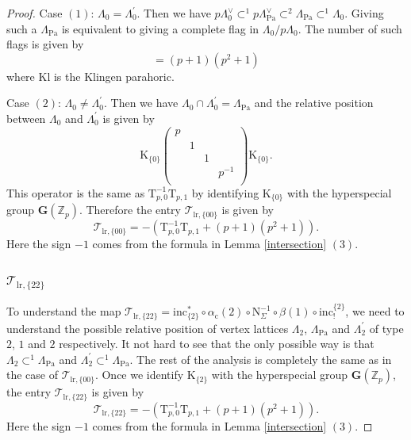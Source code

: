 \documentclass[10pt,a4paper]{amsart}
\def\Kl{\mathrm{Kl}}
\def\Pa{\mathrm{Pa}}
\def\ZZ{\mathbb{Z}}
\def\bfG{\mathbf{G}}
\def\calT{\mathcal{T}}
\def\lr{\mathrm{lr}}
\def\rmK{\mathrm{K}}
\def\rmN{\mathrm{N}}
\def\rmT{\mathrm{T}}
\def\rmc{\mathrm{c}}
\begin{document}
\begin{proof}
Case $(1)$: $\Lambda_{0}=\Lambda^{\prime}_{0}$. Then we have $p\Lambda^{\vee}_{0}\subset^{1}p\Lambda^{\vee}_{\Pa}\subset^{2} \Lambda_{\Pa}\subset ^{1}\Lambda_{0}$. Giving such a $\Lambda_{\Pa}$ is equivalent to giving a complete flag in $\Lambda_{0}/p\Lambda_{0}$. The number of such flags is given by 
\begin{equation*}
[\bfG(\ZZ_{p}): \Kl]=(p+1)(p^{2}+1) 
\end{equation*}
where $\Kl$ is the Klingen parahoric.
 
Case $(2)$: $\Lambda_{0}\neq\Lambda^{\prime}_{0}$. Then we have $\Lambda_{0}\cap\Lambda^{\prime}_{0}=\Lambda_{\Pa}$ and the relative position between $\Lambda_{0}$ and $\Lambda^{\prime}_{0}$ is given by
\begin{equation*}
\rmK_{\{0\}}\begin{pmatrix}p&&&\\&1&&\\&&1&\\&&&p^{-1}\\\end{pmatrix}\rmK_{\{0\}}.
\end{equation*}
This operator is the same as $\rmT^{-1}_{p,0}\rmT_{p,1}$ by identifying $\rmK_{\{0\}}$ with the hyperspecial group $\bfG(\ZZ_{p})$. Therefore the entry $\calT_{\mathrm{lr}, \{00\}}$ is given by  
\begin{equation*}
\calT_{\mathrm{lr}, \{00\}}=-(\rmT^{-1}_{p,0}\rmT_{p,1}+(p+1)(p^{2}+1)). 
\end{equation*}
Here the sign $-1$ comes from the formula in Lemma \ref{intersection} $(3)$.

\subsubsection{$\calT_{\mathrm{lr}, \{22\}}$} To understand the map $\calT_{\lr, \{22\}}=\mathrm{inc}^{\ast}_{\{2\}} \circ\alpha_{\rmc}(2)\circ\rmN^{-1}_{\Sigma}\circ\beta(1)\circ\mathrm{inc}^{\{2\}}_{!}$, we need to understand the possible relative position of vertex lattices $\Lambda_{2}$, $\Lambda_{\Pa}$ and $\Lambda^{\prime}_{2}$ of type $2$, $1$ and $2$ respectively. It not hard to see that the only possible way is that $\Lambda_{2}\subset^{1}\Lambda_{\Pa}$ and  $\Lambda^{\prime}_{2}\subset^{1}\Lambda_{\Pa}$. The rest of the analysis is completely the same as in the case of $\calT_{\lr,\{00\}}$. Once we identify $\rmK_{\{2\}}$ with the hyperspecial group $\bfG(\ZZ_{p})$, the entry $\calT_{\lr, \{22\}}$ is given by 
\begin{equation*}
\calT_{\lr, \{22\}}=-(\rmT^{-1}_{p,0}\rmT_{p,1}+(p+1)(p^{2}+1)). 
\end{equation*}
Here the sign $-1$ comes from the formula in Lemma \ref{intersection} $(3)$.


\end{proof}
\end{document}

